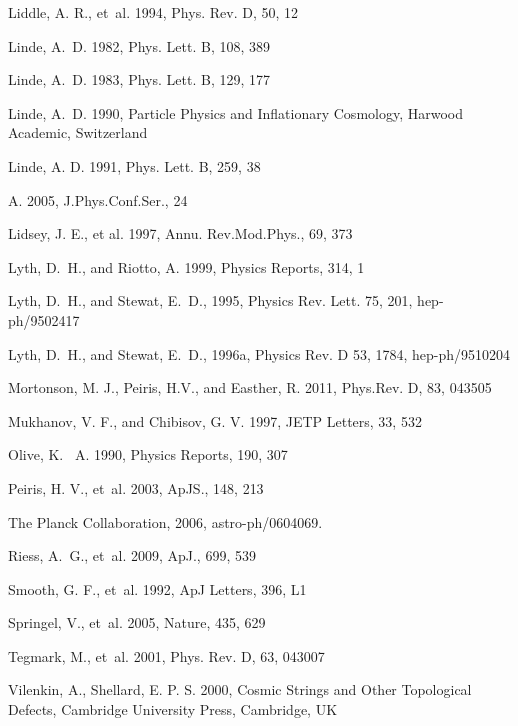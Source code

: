 \documentclass{rmaa}
\begin{document}
\begin{thebibliography}
  Liddle, A. R., et~al. 1994, Phys. Rev. D, 50, 12
  
Linde, A.~D. 1982, Phys. Lett. B, 108,  389 
 
 Linde, A.~D. 1983, Phys. Lett. B, 129, 177 

 Linde, A.~D. 1990, Particle Physics and Inflationary Cosmology, Harwood Academic,
Switzerland 

 Linde, A. D. 1991, Phys. Lett. B,  259, 38
 
 A. 2005, J.Phys.Conf.Ser., 24 
 
  Lidsey, J. E., et al. 1997, Annu. Rev.Mod.Phys., 69,  373  
 
Lyth, D.~H., and {Riotto,} A. 1999, Physics Reports, 314, 1

Lyth, D.~H., and {Stewat,} E.~D., 1995, Physics Rev. Lett. 75, 201, hep-ph/9502417

Lyth, D.~H., and {Stewat,} E.~D., 1996a, Physics Rev. D 53, 1784, hep-ph/9510204

Mortonson, M. J., Peiris, H.V., and Easther, R. 2011, Phys.Rev. D, 83, 043505 
  
 Mukhanov, V. F., and {Chibisov,} G. V. 1997, JETP Letters, 33, 532
  
 Olive, K. ~A. 1990, Physics Reports, 190, 307  

Peiris, H. V., et~al. 2003, ApJS., 148, 213  
 
   The Planck Collaboration, 2006, astro-ph/0604069. 
 
 Riess, A.~G., et~al. 2009, ApJ., 699, 539 

Smooth, G. F., et~al. 1992, ApJ Letters, 396, L1 
  
 Springel, V., et~al.  2005, Nature, 435, 629  

Tegmark, M., et~al. 2001, Phys. Rev. D, 63, 043007   

 Vilenkin, A., Shellard, E. P. S. 2000, Cosmic Strings and Other Topological Defects,
Cambridge University Press,  Cambridge, UK 




\end{thebibliography}
\end{document}
